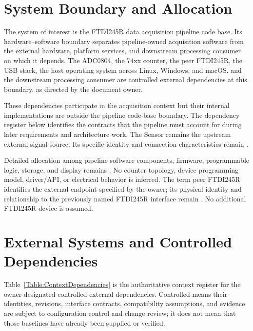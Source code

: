 \section{System Boundary and Allocation}
\label{Section:ProjectSystemBoundary}
The system of interest is the FTDI245R data acquisition pipeline code base.
Its hardware--software boundary separates pipeline-owned acquisition software
from the external hardware, platform services, and downstream processing
consumer on which it depends. The ADC0804, the 74xx counter, the peer
FTDI245R, the USB stack, the host operating system across Linux, Windows,
and macOS, and the downstream processing consumer are controlled external
dependencies at this boundary, as directed by the document owner.

These dependencies participate in the acquisition context but their internal
implementations are outside the pipeline code-base boundary. The dependency
register below identifies the contracts that the pipeline must account for
during later requirements and architecture work. The Sensor remains the
upstream external signal source. Its specific identity and connection
characteristics remain \OwnedTBD{}.

Detailed allocation among pipeline software components, firmware,
programmable logic, storage, and display remains \OwnedTBD{}. No counter topology,
device programming model, driver/API, or electrical behavior is inferred.
The term peer FTDI245R identifies the external endpoint specified by the
owner; its physical identity and relationship to the previously named
FTDI245R interface remain \OwnedTBD{}. No additional FTDI245R device is assumed.

\section{External Systems and Controlled Dependencies}
\label{Section:ContextDependencies}
Table~\ref{Table:ContextDependencies} is the authoritative context register
for the owner-designated controlled external dependencies. Controlled means
their identities, revisions, interface contracts, compatibility assumptions,
and evidence are subject to configuration control and change review; it does
not mean that those baselines have already been supplied or verified.

